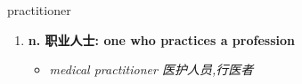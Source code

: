 
\begin{frame}
{\huge practitioner}
\begin{center}
\begin{enumerate}\Large
  \item \textbf{n. 职业人士: one who practices a profession}
  \begin{itemize}
    \item \em{\Large{medical practitioner 医护人员,行医者}}
  \end{itemize}
\end{enumerate}
\end{center}
\end{frame}
